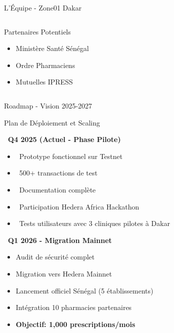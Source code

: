 \documentclass[aspectratio=169,11pt]{beamer}
\newcommand{\checkmark}{\textcolor{successGreen}{\faCheckCircle}}
\begin{document}
\begin{frame}{L'Équipe - Zone01 Dakar}
\begin{columns}[T]
\begin{alertblock}{Partenaires Potentiels}
\tiny
\begin{itemize}
    \item Ministère Santé Sénégal
    \item Ordre Pharmaciens
    \item Mutuelles IPRESS
\end{itemize}
\end{alertblock}
\end{columns}

\end{frame}

\begin{frame}{Roadmap - Vision 2025-2027}

\begin{block}{Plan de Déploiement et Scaling}
\vspace{0.2cm}

\textbf{\faCalendar~Q4 2025 (Actuel - Phase Pilote)}
\begin{itemize}
    \item \checkmark~Prototype fonctionnel sur Testnet
    \item \checkmark~500+ transactions de test
    \item \checkmark~Documentation complète
    \item \faSpinner~Participation Hedera Africa Hackathon
    \item \faSpinner~Tests utilisateurs avec 3 cliniques pilotes à Dakar
\end{itemize}

\vspace{0.2cm}

\textbf{\faRocket~Q1 2026 - Migration Mainnet}
\begin{itemize}
    \item Audit de sécurité complet
    \item Migration vers Hedera Mainnet
    \item Lancement officiel Sénégal (5 établissements)
    \item Intégration 10 pharmacies partenaires
    \item \textbf{Objectif: 1,000 prescriptions/mois}
\end{itemize}
\end{block}

\end{frame}
\end{document}
